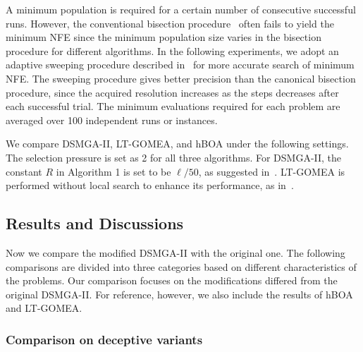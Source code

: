 \documentclass{sig-alternate-05-2015}
\begin{document}
A minimum population is required for a certain number of consecutive successful runs.
However, the conventional bisection procedure~\cite{pelikan:hBOA} often fails to yield the minimum NFE  since the minimum population size varies in the bisection procedure for different algorithms.
In the following experiments, we adopt an adaptive sweeping procedure described in~\cite{hsu:DSMGA2} for more accurate search of minimum NFE.
The sweeping procedure gives better precision than the canonical bisection procedure, since the acquired resolution increases as the steps decreases after each successful trial.
The minimum evaluations required for each problem are averaged over 100 independent runs or instances.

We compare DSMGA-II, LT-GOMEA, and hBOA under the following settings. 
The selection pressure is set as 2 for all three algorithms. 
For DSMGA-II, the constant $R$ in Algorithm 1 is set to be $\ell/50$, as suggested in~\cite{hsu:DSMGA2}.
LT-GOMEA is performed without local search to enhance its performance, as in~\cite{bosman:LT-GOMEA}.




\subsection{Results and Discussions}

Now we compare the modified DSMGA-II with the original one. The following comparisons are divided into three categories based on different characteristics of the problems. Our comparison focuses on the modifications differed from the original DSMGA-II. For reference, however, we also include the results of hBOA and LT-GOMEA. 

\subsubsection{ Comparison on deceptive variants }
\end{document}
